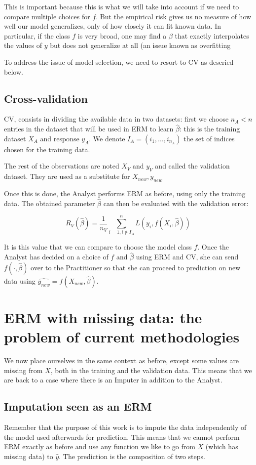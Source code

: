  This is important because this is what we will take into account if we need to compare multiple choices for $f$. But the empirical risk gives us no measure of how well our model generalizes, only of how closely it can fit known data. In particular, if the class $f$ is very broad, one may find a $\beta$ that exactly interpolates the values of $y$ but does not generalize at all (an issue known as overfitting \cite{hawkins2004overfitting}

To address the issue of model selection, we need to resort to CV as descried below.

		\subsection{Cross-validation}
CV, consists in dividing the available data in two datasets: first we choose $n_A < n$ entries in the dataset that will be used in ERM to learn $\hat{\beta}$: this is the training dataset $X_A$ and response $y_A$. We denote $I_A = (i_1, \ldots, i_{n_A})$ the set of indices chosen for the training data.

The rest of the observations are noted $X_V$ and $y_V$ and called the validation dataset. They are used as a substitute for $X_{new},y_{new}$

Once this is done, the Analyst performs ERM as before, using only the training data. The obtained parameter $\hat{\beta}$ can then be evaluated with the validation error:

$$ R_{V}(\hat{\beta}) = \frac{1}{n_V} \sum\limits_{i=1, i \notin I_A}^n L(y_i, f(X_i, \hat{\beta}))$$

It is this value that we can compare to choose the model class $f$. Once the Analyst has decided on a choice of $f$ and $\hat{\beta}$ using ERM and CV, she can send $f(\cdot, \hat{\beta})$ over to the Practitioner so that she can proceed to prediction on new data using $\hat{y_{new}} = f(X_{new}, \hat{\beta})$.

	\section{ERM with missing data: the problem of current methodologies}
	\label{ERM.imp}
We now place ourselves in the same context as before, except some values are missing from $X$, both in the training and the validation data. This means that we are back to a case where there is an Imputer in addition to the Analyst.
		\subsection{Imputation seen as an ERM}
Remember that the purpose of this work is to impute the data independently of the model used afterwards for prediction. This means that we cannot perform ERM exactly as before and use any function we like to go from $X$ (which has missing data) to $\hat{y}$. The prediction is the composition of two steps.
